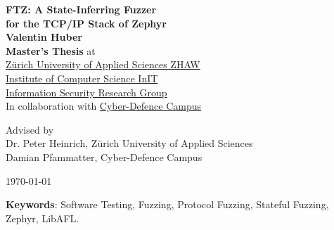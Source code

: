 \documentclass[twocolumn]{article}
\newcommand{\proj}{FTZ\xspace}
\begin{document}
\begin{titlepage}
  \large

  \begin{center}
    {\Huge\bfseries \proj : A State-Inferring Fuzzer\\[10pt]for the TCP/IP Stack of Zephyr}\\
    {\Large\bfseries Valentin Huber}\\
    {{\bfseries Master's Thesis} at}\\[1ex]
    \href{https://www.zhaw.ch/en/engineering/institutes-centres/init/information-security}{
      Zürich University of Applied Sciences ZHAW\\
      Institute of Computer Science InIT\\
      Information Security Research Group
    }\\[2ex]
    In collaboration with \href{https://www.cydcampus.admin.ch/}{Cyber-Defence Campus}\\

    Advised by\\
    Dr. Peter Heinrich, Zürich University of Applied Sciences\\
    Damian Pfammatter, Cyber-Defence Campus\\


    \today

  \end{center}
\end{titlepage}

\clearpage\newpage
\onecolumn
\begin{center}
  \begin{minipage}{0.8\textwidth}
    \vspace{70px}
    \begin{abstract}
      \lipsum[1]\lipsum[2]\lipsum[3]
    \end{abstract}
  \end{minipage}
  \vspace{70px}

  \begin{minipage}{0.7\textwidth}
    \textbf{Keywords}: Software Testing, Fuzzing, Protocol Fuzzing, Stateful Fuzzing, Zephyr, LibAFL.
  \end{minipage}
\end{center}
\end{document}
